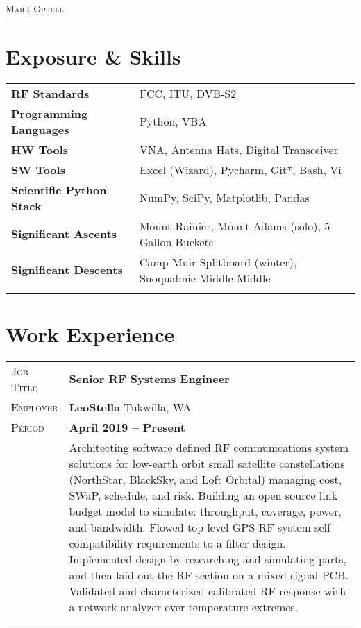\documentclass[a4paper, oneside, final]{scrartcl}
\newcommand{\gray}{\rowcolor[gray]{.90}} %
\begin{document}
\begin{center} %

\pdfpageheight 11in 
\pdfpagewidth 8.5in


{\fontsize{36}{36}\selectfont\scshape Mark Opfell} 
\vspace{1.16 cm} %


\section{Exposure \& Skills}
\begin{tabular}{ @{} >{\bfseries}l @{\hspace{6ex}} l }
RF Standards & FCC, ITU, DVB-S2 \\
Programming Languages & Python, VBA\\
HW Tools & VNA, Antenna Hats, Digital Transceiver\\
SW Tools & Excel (Wizard), Pycharm, Git*, Bash, Vi\\
Scientific Python Stack & NumPy, SciPy, Matplotlib, Pandas \\
Significant Ascents & Mount Rainier, Mount Adams (solo), 5 Gallon Buckets \\
Significant Descents & Camp Muir Splitboard (winter), Snoqualmie Middle-Middle \\ 
\\
\end{tabular}

\section{Work Experience}

\begin{tabularx}{0.97\linewidth}{>{\raggedleft\scshape}p{2cm}X}
\gray Job Title & \textbf{Senior RF Systems Engineer}\\
\gray Employer & \textbf{LeoStella} \hfill Tukwilla, WA\\
\gray Period & \textbf{April 2019 -- Present}\\
&
\vspace{-0.15 cm}
Architecting software defined RF communications system solutions for low-earth orbit small satellite constellations (NorthStar, BlackSky, and Loft Orbital) managing cost, SWaP, schedule, and risk.  Building an open source link budget model to simulate: throughput, coverage, power, and bandwidth.
\newline
\newline
Flowed top-level GPS RF system self-compatibility requirements to a filter design. Implemented design by researching and simulating parts, and then laid out the RF section on a mixed signal PCB.  Validated and characterized calibrated RF response with a network analyzer over temperature extremes. 
\newline
\newline
\\
\\
\end{tabularx}


\end{center}
\end{document}
